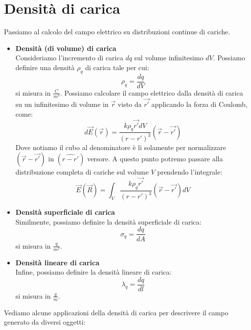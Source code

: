 \documentclass[a4paper,12pt]{article}
\begin{document}
\section{Densità di carica}
Passiamo al calcolo del campo elettrico su distribuzioni continue di cariche.
\begin{itemize}
  \item \textbf{Densità (di volume) di carica} \\
    Consideriamo l'incremento di carica $dq$ sul volume infinitesimo $dV$. Possiamo definire una densità $\rho_q$ di carica tale per cui:
    $$ \rho_q = \frac{dq}{dV} $$
    si misura in $\frac{C}{m^3}$. Possiamo calcolare il campo elettrico dalla densità di carica su un infinitesimo di volume in $\vec{r}$ visto da $\vec{r'}$ applicando la forza di Coulomb, come:
    $$ d\vec{E}(\vec{r}) = \frac{k\rho_q{\vec{r'}}dV}{(r-r')^3}(\vec{r}-\vec{r'})$$
    Dove notiamo il cubo al denominatore è li solamente per normalizzare $(\vec{r} - \vec{r'})$ in $(\hat{r-r'})$ versore. A questo punto potremo passare alla distribuzione completa di cariche sul volume $V$ prendendo l'integrale:
    $$ \vec{E}(\vec{R}) = \int_V \frac{k\rho_q{\vec{r'}}}{(r-r')^3}(\vec{r}-\vec{r'})dV $$
  \item \textbf{Densità superficiale di carica} \\
    Similmente, possiamo definire la densità superficiale di carica:
    $$ \sigma_q = \frac{dq}{dA} $$
    si misura in $\frac{q}{m^2}$.
  \item \textbf{Densità lineare di carica} \\
    Infine, possiamo definire la densità lineare di carica:
    $$ \lambda_q = \frac{dq}{dl} $$
    si misura in $\frac{q}{m}$. 
\end{itemize}
Vediamo alcune applicazioni della densità di carica per descrivere il campo generato da diversi oggetti:
\end{document}
